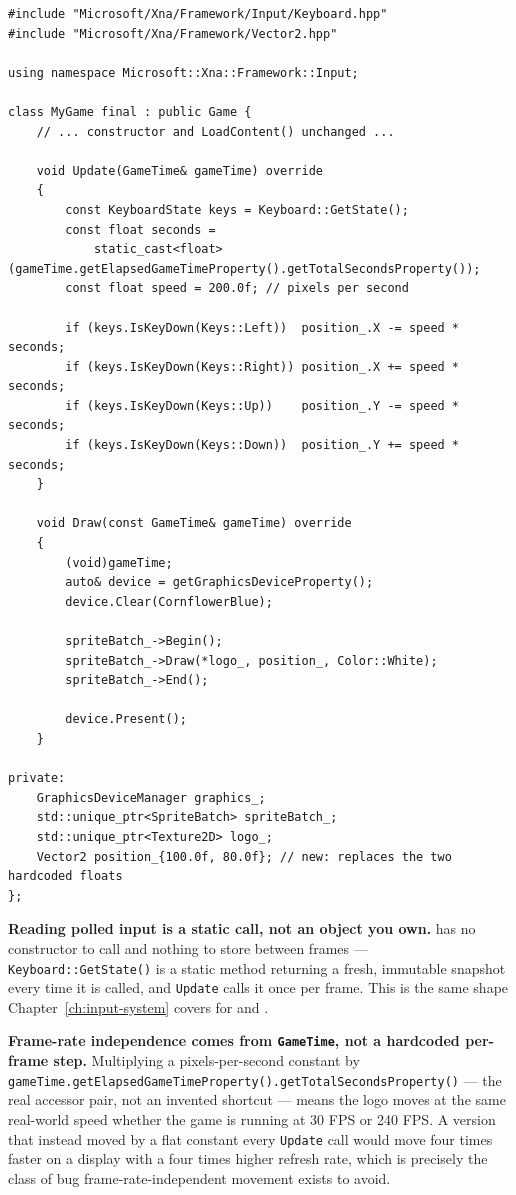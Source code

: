 \begin{lstlisting}
#include "Microsoft/Xna/Framework/Input/Keyboard.hpp"
#include "Microsoft/Xna/Framework/Vector2.hpp"

using namespace Microsoft::Xna::Framework::Input;

class MyGame final : public Game {
    // ... constructor and LoadContent() unchanged ...

    void Update(GameTime& gameTime) override
    {
        const KeyboardState keys = Keyboard::GetState();
        const float seconds =
            static_cast<float>(gameTime.getElapsedGameTimeProperty().getTotalSecondsProperty());
        const float speed = 200.0f; // pixels per second

        if (keys.IsKeyDown(Keys::Left))  position_.X -= speed * seconds;
        if (keys.IsKeyDown(Keys::Right)) position_.X += speed * seconds;
        if (keys.IsKeyDown(Keys::Up))    position_.Y -= speed * seconds;
        if (keys.IsKeyDown(Keys::Down))  position_.Y += speed * seconds;
    }

    void Draw(const GameTime& gameTime) override
    {
        (void)gameTime;
        auto& device = getGraphicsDeviceProperty();
        device.Clear(CornflowerBlue);

        spriteBatch_->Begin();
        spriteBatch_->Draw(*logo_, position_, Color::White);
        spriteBatch_->End();

        device.Present();
    }

private:
    GraphicsDeviceManager graphics_;
    std::unique_ptr<SpriteBatch> spriteBatch_;
    std::unique_ptr<Texture2D> logo_;
    Vector2 position_{100.0f, 80.0f}; // new: replaces the two hardcoded floats
};
\end{lstlisting}

\textbf{Reading polled input is a static call, not an object you own.}  has
no constructor to call and nothing to store between frames --- \texttt{Keyboard::GetState()}
is a static method returning a fresh, immutable  snapshot every time
it is called, and \texttt{Update} calls it once per frame. This is the same shape
Chapter~\ref{ch:input-system} covers for  and .

\textbf{Frame-rate independence comes from \texttt{GameTime}, not a hardcoded per-frame
step.} Multiplying a pixels-per-second constant by
\texttt{gameTime.get\allowbreak{}ElapsedGameTimeProperty().get\allowbreak{}TotalSecondsProperty()} --- the real
 accessor pair, not an invented shortcut --- means the logo moves at the
same real-world speed whether the game is running at 30 FPS or 240 FPS. A version that instead
moved by a flat constant every \texttt{Update} call would move four times faster on a display
with a four times higher refresh rate, which is precisely the class of bug frame-rate-independent
movement exists to avoid.

